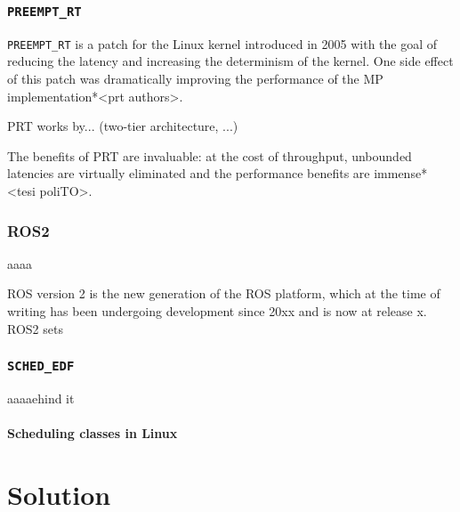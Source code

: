 \documentclass[a4paper,12pt]{report}
\begin{document}
\subsection{\texttt{PREEMPT\_RT}}

\texttt{PREEMPT\_RT} is a patch for the Linux kernel introduced in 2005 with the goal of reducing the latency and increasing the determinism of the kernel\cite{survey-preempt-rt}. One side effect of this patch was dramatically improving the performance of the MP implementation*<prt authors>.

PRT works by... (two-tier architecture, ...)

The benefits of PRT are invaluable: at the cost of throughput, unbounded latencies are virtually eliminated and the performance benefits are immense*<tesi poliTO>.

\subsection{ROS2}
aaaa

ROS version 2 is the new generation of the ROS platform, which at the time of writing has been undergoing development since 20xx and is now at release x. ROS2 sets




\subsection{\texttt{SCHED\_EDF}}

aaaaehind it


\subsubsection{Scheduling classes in Linux}




\newpage
\chapter{Solution}
\end{document}
